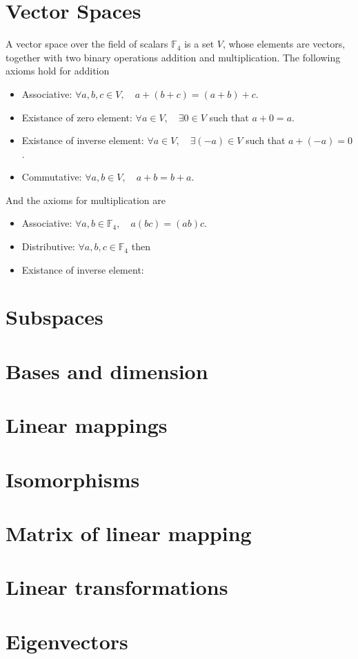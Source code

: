 \documentclass[12pt]{article}
\begin{document}
\section{Vector Spaces}
	\begin{defn}
		A vector space over the field of scalars $\mathbb{F}_4$ is a set $V$, whose elements are vectors, together with two binary operations addition and multiplication. The following axioms hold for addition
		\begin{itemize}
			\item Associative: $\forall a,b,c \in V, \quad a + ( b + c ) = (a + b) + c$.
			\item Existance of zero element: $\forall a \in V, \quad \exists 0 \in V$ such that $a + 0 = a$.
			\item Existance of inverse element: $\forall a \in V, \quad \exists (-a) \in V$ such that $a + (-a) = 0$.
			\item Commutative: $\forall a,b \in V, \quad a + b = b + a$.
		\end{itemize}
		And the axioms for multiplication are
		\begin{itemize}
			\item Associative: $\forall a,b \in \mathbb{F}_4, \quad a(bc) = (ab)c$.
			\item Distributive: $\forall a,b,c \in \mathbb{F}_4$ then
			\item Existance of inverse element:
		\end{itemize}
	\end{defn}
	
	
\section{Subspaces}
\section{Bases and dimension}
\section{Linear mappings}
\section{Isomorphisms}
\section{Matrix of linear mapping}
\section{Linear transformations}
\section{Eigenvectors}
\end{document}

